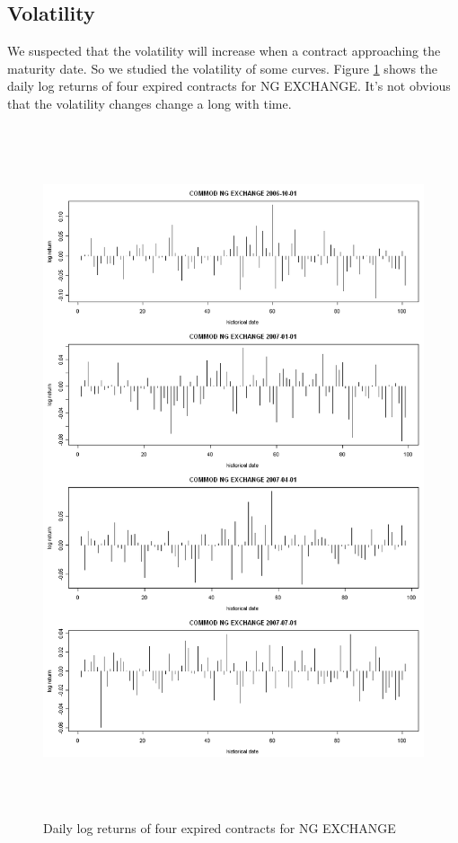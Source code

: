 \subsection{Volatility}
We suspected that the volatility will increase when 
a contract approaching the maturity date. So we 
studied the volatility of some curves. 
Figure \ref{ng-exch-vol} shows the daily log returns of 
four expired contracts for NG EXCHANGE. It's not obvious 
that the volatility changes change a long with time.
\begin{figure}[htbp]
\centering
\includegraphics[width=6in, height=8in]{figures/ng-exch-vol.png}
\caption{Daily log returns of four expired contracts for NG EXCHANGE}
\label{ng-exch-vol}
\end{figure}

